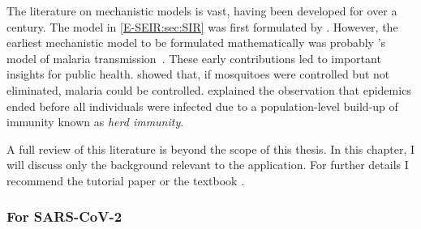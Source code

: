 \documentclass[thesis.tex]{subfiles}
\begin{document}
The literature on mechanistic models is vast, having been developed for over a century.
The model in \cref{E-SEIR:sec:SIR} was first formulated by \textcite{kermackContribution}.
However, the earliest mechanistic model to be formulated mathematically was probably \textcite{rossMalariaA}'s model of malaria transmission~\autocite{lesslerMechanistic}.
These early contributions led to important insights for public health.
\Textcite{rossMalariaA} showed that, if mosquitoes were controlled but not eliminated, malaria could be controlled.
\Textcite{kermackContribution} explained the observation that epidemics ended before all individuals were infected due to a population-level build-up of immunity known as \emph{herd immunity}.

A full review of this literature is beyond the scope of this thesis.
In this chapter, I will discuss only the background relevant to the application.
For further details I recommend the tutorial paper \textcite{kretzschmarMathematical} or the textbook \textcite{keelingModeling}.


\subsubsection{For SARS-CoV-2}
\end{document}
